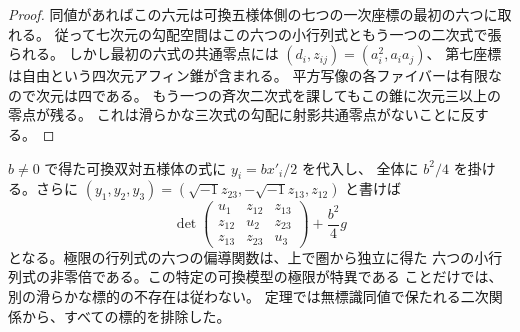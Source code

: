 \begin{proof}
同値があればこの六元は可換五様体側の七つの一次座標の最初の六つに取れる。
従って七次元の勾配空間はこの六つの小行列式ともう一つの二次式で張られる。
しかし最初の六式の共通零点には $(d_i,z_{ij})=(a_i^2,a_i a_j)$、
第七座標は自由という四次元アフィン錐が含まれる。
平方写像の各ファイバーは有限なので次元は四である。
もう一つの斉次二次式を課してもこの錐に次元三以上の零点が残る。
これは滑らかな三次式の勾配に射影共通零点がないことに反する。
\end{proof}

\begin{remark}[可換側の方程式による照合]
$b\ne0$ で得た可換双対五様体の式に $y_i=bx'_i/2$ を代入し、
全体に $b^2/4$ を掛ける。さらに
$(y_1,y_2,y_3)=(\sqrt{-1}z_{23},-\sqrt{-1}z_{13},z_{12})$ と書けば
\[
 \det\begin{pmatrix}
 u_1&z_{12}&z_{13}\\z_{12}&u_2&z_{23}\\z_{13}&z_{23}&u_3
 \end{pmatrix}+\frac{b^2}{4}g
\]
となる。極限の行列式の六つの偏導関数は、上で圏から独立に得た
六つの小行列式の非零倍である。この特定の可換模型の極限が特異である
ことだけでは、別の滑らかな標的の不存在は従わない。
定理では無標識同値で保たれる二次関係から、すべての標的を排除した。
\end{remark}
